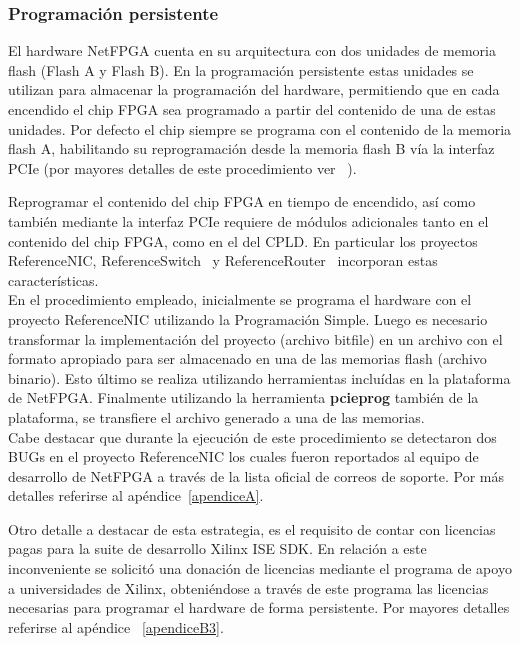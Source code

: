 \subsubsection{Programaci\'on persistente}
El hardware NetFPGA cuenta en su arquitectura con dos unidades de memoria flash (Flash A y Flash B). En la programaci\'on persistente estas unidades se utilizan para almacenar la programaci\'on del hardware, permitiendo que en cada encendido el chip FPGA sea programado a partir del contenido de una de estas unidades. Por defecto el chip siempre se programa con el contenido de la memoria flash A, habilitando su reprogramaci\'on desde la memoria flash B v\'ia la interfaz PCIe (por mayores detalles de este procedimiento ver ~\citep{PCIEProgProject}).

Reprogramar el contenido del chip FPGA en tiempo de encendido, así como también mediante la interfaz PCIe requiere de módulos adicionales tanto en el contenido del chip FPGA, como en el del CPLD. En particular los proyectos ReferenceNIC\citep{ReferenceNICProject}, ReferenceSwitch~\citep{ReferenceSwitchProject} y ReferenceRouter~\citep{ReferenceRouterProject} incorporan estas características.\\

En el procedimiento empleado, inicialmente se programa el hardware con el proyecto ReferenceNIC utilizando la Programaci\'on Simple. Luego es necesario transformar la implementaci\'on del proyecto (archivo bitfile) en un archivo con el formato apropiado para ser almacenado en una de las memorias flash (archivo binario). Esto \'ultimo se realiza utilizando herramientas inclu\'idas en la plataforma de NetFPGA. Finalmente utilizando la herramienta \textbf{pcieprog} también de la plataforma, se transfiere el archivo generado a una de las memorias.\\

Cabe destacar que durante la ejecuci\'on de este procedimiento se detectaron dos BUGs en el proyecto ReferenceNIC los cuales fueron reportados al equipo de desarrollo de NetFPGA a través de la lista oficial de correos de soporte. Por m\'as detalles referirse al ap\'endice~\ref{apendiceA}.

Otro detalle a destacar de esta estrategia, es el requisito de contar con licencias pagas para la suite de desarrollo Xilinx ISE SDK. En relaci\'on a este inconveniente se solicit\'o una donaci\'on de licencias mediante el programa de apoyo a universidades de Xilinx, obteniéndose a trav\'es de este programa las licencias necesarias para programar el hardware de forma persistente. Por mayores detalles referirse al ap\'endice ~\ref{apendiceB3}.

